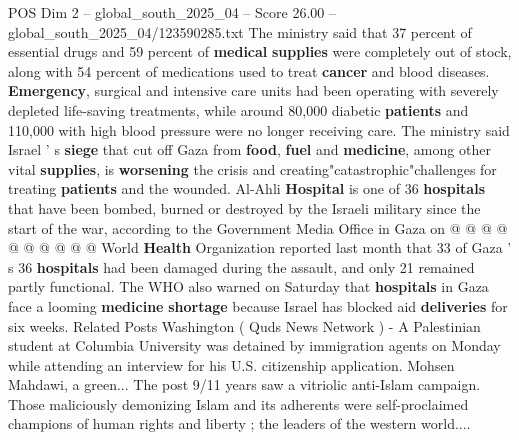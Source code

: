 \begin{textsample}{POS Dim 2 – global\_south\_2025\_04 – Score 26.00 – global\_south\_2025\_04/123590285.txt}
The ministry said that 37 percent of essential drugs and 59 percent of \textbf{medical} \textbf{supplies} were completely out of stock, along with 54 percent of medications used to treat \textbf{cancer} and blood diseases. \textbf{Emergency}, surgical and intensive care units had been operating with severely depleted life-saving treatments, while around 80,000 diabetic \textbf{patients} and 110,000 with high blood pressure were no longer receiving care.
The ministry said Israel ' s \textbf{siege} that cut off Gaza from \textbf{food}, \textbf{fuel} and \textbf{medicine}, among other vital \textbf{supplies}, is \textbf{worsening} the crisis and creating"catastrophic"challenges for treating \textbf{patients} and the wounded.
Al-Ahli \textbf{Hospital} is one of 36 \textbf{hospitals} that have been bombed, burned or destroyed by the Israeli military since the start of the war, according to the Government Media Office in Gaza on @ @ @ @ @ @ @ @ @ @ World \textbf{Health} Organization reported last month that 33 of Gaza ' s 36 \textbf{hospitals} had been damaged during the assault, and only 21 remained partly functional.
The WHO also warned on Saturday that \textbf{hospitals} in Gaza face a looming \textbf{medicine} \textbf{shortage} because Israel has blocked aid \textbf{deliveries} for six weeks.
Related Posts Washington ( Quds News Network ) - A Palestinian student at Columbia University was detained by immigration agents on Monday while attending an interview for his U.S. citizenship application.
Mohsen Mahdawi, a green...
The post 9/11 years saw a vitriolic anti-Islam campaign.
Those maliciously demonizing Islam and its adherents were self-proclaimed champions of human rights and liberty ; the leaders of the western world....

\end{textsample}
